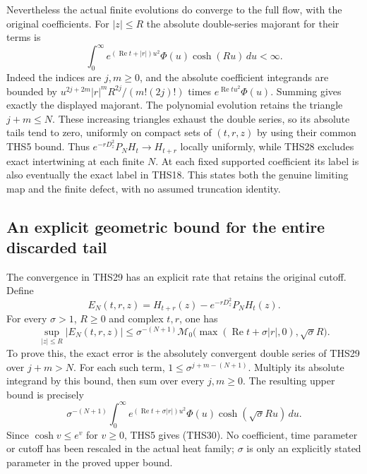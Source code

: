 Nevertheless the actual finite evolutions do converge to the
full flow, with the original coefficients. For $|z|\le R$ the
absolute double-series majorant for their terms is
\begin{equation}\tag{THS29}
 \int_0^\infty
 e^{(\operatorname{Re}t+|r|)u^2}\Phi(u)\cosh(Ru)\,du<\infty.
\end{equation}
Indeed the indices are $j,m\ge0$, and the absolute coefficient
integrands are bounded by
$u^{2j+2m}|r|^mR^{2j}/(m!(2j)!)$ times
$e^{\operatorname{Re}tu^2}\Phi(u)$. Summing gives exactly
the displayed majorant. The polynomial evolution retains the
triangle $j+m\le N$. These increasing triangles exhaust the
double series, so its absolute tails tend to zero, uniformly
on compact sets of $(t,r,z)$ by using their common THS5 bound.
Thus $e^{-rD_z^2}P_NH_t\to H_{t+r}$ locally uniformly, while
THS28 excludes exact intertwining at each finite $N$.
At each fixed supported coefficient its label is also eventually
the exact label in THS18. This states both the genuine limiting
map and the finite defect, with no assumed truncation identity.

\subsection{An explicit geometric bound for the entire discarded tail}

The convergence in THS29 has an explicit rate that retains the
original cutoff. Define
\[
 E_N(t,r,z)=H_{t+r}(z)-e^{-rD_z^2}P_NH_t(z).
\]
For every $\sigma>1$, $R\ge0$ and complex $t,r$, one has
\begin{equation}\tag{THS30}
 \sup_{|z|\le R}|E_N(t,r,z)|
 \le\sigma^{-(N+1)}
 \mathcal M_0\bigl(\max(\operatorname{Re}t+\sigma|r|,0),
                         \sqrt\sigma R\bigr).
\end{equation}
To prove this, the exact error is the absolutely convergent
double series of THS29 over $j+m>N$. For each such term,
$1\le\sigma^{j+m-(N+1)}$. Multiply its absolute integrand by
this bound, then sum over every $j,m\ge0$. The resulting upper
bound is precisely
\[
 \sigma^{-(N+1)}\int_0^\infty
 e^{(\operatorname{Re}t+\sigma|r|)u^2}\Phi(u)
                  \cosh(\sqrt\sigma R u)\,du.
\]
Since $\cosh v\le e^v$ for $v\ge0$, THS5 gives (THS30).
No coefficient, time parameter or cutoff has been rescaled in
the actual heat family; $\sigma$ is only an explicitly stated
parameter in the proved upper bound.

